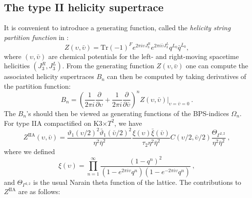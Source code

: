 \documentclass[a4paper,11pt]{article}
\numberwithin{equation}{section}
\def\be{\begin{equation}}
\def\ee{\end{equation}}
\begin{document}
\subsection{The type II helicity supertrace}
It is convenient to introduce a generating function, called the \emph{helicity string partition function} in \cite{Kiritsis:1997hj}:
\be
Z( \upsilon, \bar{ \upsilon})=\text{Tr}(-1)^F e^{2\pi i  \upsilon J_3^{R}} e^{2\pi i \bar{ \upsilon} J_3^{L}} q^{L_0} \bar{q}^{\bar{L}_0}, 
\ee
where $( \upsilon, \bar{ \upsilon})$ are chemical potentials for the left- and right-moving spacetime helicities $(J_3^{R}, J_3^L)$. From the generating function $Z( \upsilon, \bar{ \upsilon})$ one can compute the associated helicity supertraces  $B_n$ can then 
be computed by taking derivatives of the partition function: 
\be B_n=\left(\frac{1}{2\pi i} \frac{\partial}{\partial \upsilon}+\frac{1}{2\pi i} \frac{\partial}{\partial \bar\upsilon}\right)^n Z(\upsilon,\bar \upsilon)\Big|_{\upsilon=\bar \upsilon=0}\ .
\ee 
The $B_n$'s should then be viewed as generating functions of the BPS-indices $\Omega_n$. For type IIA compactified on K3$\times T^2$, we have
\be\label{ZIIA} Z^{\text{IIA}}(\upsilon,\bar \upsilon)=\frac{\vartheta_1(\upsilon/2)^2\bar\vartheta_1(\bar\upsilon/2)^2  }{\eta^2\bar\eta^2}\frac{\xi(\upsilon)\bar\xi(\bar\upsilon)}{\tau_2\eta^2\bar\eta^2}C%
(\upsilon/2,\bar\upsilon/2)\frac{\Theta_{\Gamma^{2,2}} }{\eta^2\bar\eta^2}\ ,
\ee 
where we defined
\be \xi(\upsilon)=\prod_{n=1}^\infty \frac{(1-q^n)^2}{(1-e^{2\pi i \upsilon} q^n)(1-e^{-2\pi i \upsilon} q^n)}\ ,
\ee 
and $\Theta_{\Gamma^{2,2}}$ is the usual Narain theta function of the lattice.
The contributions to $Z^{\text{IIA}}$ are as follows:
\end{document}
